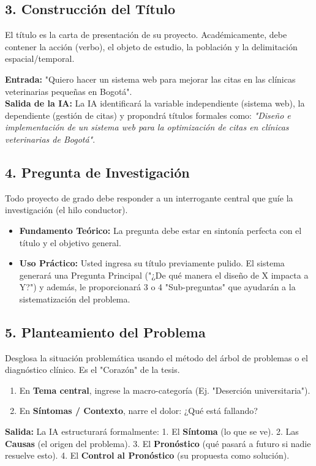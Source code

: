 \documentclass[12pt,a4paper]{article}
\begin{document}
\subsection{3. Construcción del Título}
El título es la carta de presentación de su proyecto. Académicamente, debe contener la acción (verbo), el objeto de estudio, la población y la delimitación espacial/temporal.
\begin{tcolorbox}[colback=lightgray, colframe=primary, title=Ejemplo Práctico]
\textbf{Entrada:} "Quiero hacer un sistema web para mejorar las citas en las clínicas veterinarias pequeñas en Bogotá".\\
\textbf{Salida de la IA:} La IA identificará la variable independiente (sistema web), la dependiente (gestión de citas) y propondrá títulos formales como: \textit{"Diseño e implementación de un sistema web para la optimización de citas en clínicas veterinarias de Bogotá"}.
\end{tcolorbox}

\subsection{4. Pregunta de Investigación}
Todo proyecto de grado debe responder a un interrogante central que guíe la investigación (el hilo conductor).
\begin{itemize}
    \item \textbf{Fundamento Teórico:} La pregunta debe estar en sintonía perfecta con el título y el objetivo general.
    \item \textbf{Uso Práctico:} Usted ingresa su título previamente pulido. El sistema generará una Pregunta Principal ("¿De qué manera el diseño de X impacta a Y?") y además, le proporcionará 3 o 4 "Sub-preguntas" que ayudarán a la sistematización del problema.
\end{itemize}

\subsection{5. Planteamiento del Problema}
Desglosa la situación problemática usando el método del árbol de problemas o el diagnóstico clínico. Es el "Corazón" de la tesis.
\begin{tcolorbox}[colback=lightgray, colframe=primary, title=Paso a Paso]
\begin{enumerate}
    \item En \textbf{Tema central}, ingrese la macro-categoría (Ej. "Deserción universitaria").
    \item En \textbf{Síntomas / Contexto}, narre el dolor: ¿Qué está fallando? 
\end{enumerate}
\end{tcolorbox}
\textbf{Salida:} La IA estructurará formalmente:
1. El \textbf{Síntoma} (lo que se ve).
2. Las \textbf{Causas} (el origen del problema).
3. El \textbf{Pronóstico} (qué pasará a futuro si nadie resuelve esto).
4. El \textbf{Control al Pronóstico} (su propuesta como solución).
\end{document}
